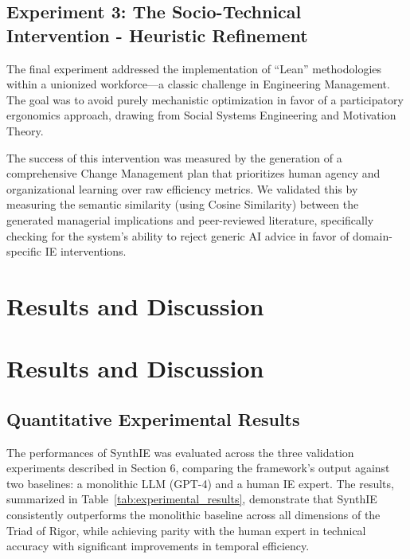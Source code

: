 \documentclass[12pt,a4paper]{article}
\begin{document}
\subsection{Experiment 3: The Socio-Technical Intervention - Heuristic Refinement}

The final experiment addressed the implementation of ``Lean'' methodologies within a unionized workforce—a classic challenge in Engineering Management. The goal was to avoid purely mechanistic optimization in favor of a participatory ergonomics approach, drawing from Social Systems Engineering and Motivation Theory.

The success of this intervention was measured by the generation of a comprehensive Change Management plan that prioritizes human agency and organizational learning over raw efficiency metrics. We validated this by measuring the semantic similarity (using Cosine Similarity) between the generated managerial implications and peer-reviewed literature, specifically checking for the system's ability to reject generic AI advice in favor of domain-specific IE interventions.

\section{Results and Discussion}

\section{Results and Discussion}

\subsection{Quantitative Experimental Results}

The performances of SynthIE was evaluated across the three validation experiments described in Section 6, comparing the framework's output against two baselines: a monolithic LLM (GPT-4) and a human IE expert. The results, summarized in Table~\ref{tab:experimental_results}, demonstrate that SynthIE consistently outperforms the monolithic baseline across all dimensions of the Triad of Rigor, while achieving parity with the human expert in technical accuracy with significant improvements in temporal efficiency.
\end{document}
